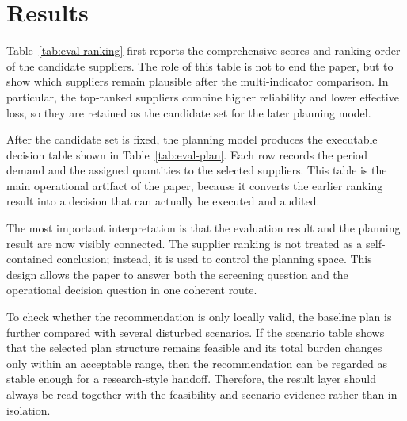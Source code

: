 \section{Results}

Table~\ref{tab:eval-ranking} first reports the comprehensive scores and ranking order of the candidate suppliers. The role of this table is not to end the paper, but to show which suppliers remain plausible after the multi-indicator comparison. In particular, the top-ranked suppliers combine higher reliability and lower effective loss, so they are retained as the candidate set for the later planning model.



After the candidate set is fixed, the planning model produces the executable decision table shown in Table~\ref{tab:eval-plan}. Each row records the period demand and the assigned quantities to the selected suppliers. This table is the main operational artifact of the paper, because it converts the earlier ranking result into a decision that can actually be executed and audited.



The most important interpretation is that the evaluation result and the planning result are now visibly connected. The supplier ranking is not treated as a self-contained conclusion; instead, it is used to control the planning space. This design allows the paper to answer both the screening question and the operational decision question in one coherent route.

To check whether the recommendation is only locally valid, the baseline plan is further compared with several disturbed scenarios. If the scenario table shows that the selected plan structure remains feasible and its total burden changes only within an acceptable range, then the recommendation can be regarded as stable enough for a research-style handoff. Therefore, the result layer should always be read together with the feasibility and scenario evidence rather than in isolation.

